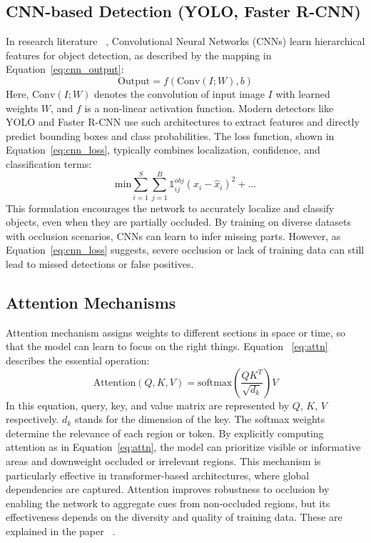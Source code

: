 \documentclass[12pt,a4paper]{report}
\theoremstyle{definition}
\theoremstyle{remark}
\begin{document}
\subsection{CNN-based Detection (YOLO, Faster R-CNN)}
In research literature ~\cite{paper1,paper4,paper11,paper19}, Convolutional Neural Networks (CNNs) learn hierarchical features for object detection, as described by the mapping in Equation~\ref{eq:cnn_output}:
\begin{equation}
\label{eq:cnn_output}
\text{Output} = f(\text{Conv}(I; W), b)
\end{equation}
Here, $\text{Conv}(I; W)$ denotes the convolution of input image $I$ with learned weights $W$, and $f$ is a non-linear activation function. Modern detectors like YOLO and Faster R-CNN use such architectures to extract features and directly predict bounding boxes and class probabilities. The loss function, shown in Equation~\ref{eq:cnn_loss}, typically combines localization, confidence, and classification terms:
\begin{equation}
\label{eq:cnn_loss}
\text{min} \sum_{i=1}^S \sum_{j=1}^B \mathbb{1}_{ij}^{obj} (x_i - \hat{x}_i)^2 + ...
\end{equation}
This formulation encourages the network to accurately localize and classify objects, even when they are partially occluded. By training on diverse datasets with occlusion scenarios, CNNs can learn to infer missing parts. However, as Equation~\ref{eq:cnn_loss} suggests, severe occlusion or lack of training data can still lead to missed detections or false positives. 

\subsection{Attention Mechanisms}
Attention mechanism assigns weights to different sections in space or time, so that the model can learn to focus on the right things. Equation ~\ref{eq:attn} describes the essential operation:
\begin{equation}
\label{eq:attn}
\text{Attention}(Q, K, V) = \text{softmax}\left(\frac{QK^T}{\sqrt{d_k}}\right)V
\end{equation}
In this equation, query, key, and value matrix are represented by $Q$, $K$, $V$ respectively. $d_k$ stands for the dimension of the key. The softmax weights determine the relevance of each region or token. By explicitly computing attention as in Equation~\ref{eq:attn}, the model can prioritize visible or informative areas and downweight occluded or irrelevant regions. This mechanism is particularly effective in transformer-based architectures, where global dependencies are captured. Attention improves robustness to occlusion by enabling the network to aggregate cues from non-occluded regions, but its effectiveness depends on the diversity and quality of training data. These are explained in the paper ~\cite{paper33}.
\end{document}
